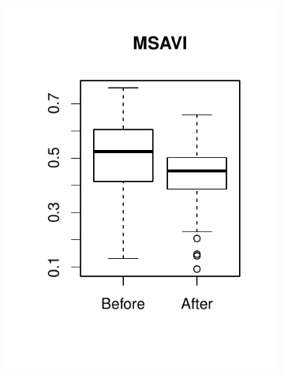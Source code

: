 \documentclass[a4paper,12pt]{scrbook}
\begin{document}
\begin{figure}
\begin{subfigure}[b]{0.32\textwidth}
    \includegraphics[width=\textwidth]{thesis-figures/06-boxplot-msavi}
  \end{subfigure}
  \begin{subfigure}[b]{0.32\textwidth}

\end{subfigure}
\end{figure}
\end{document}
